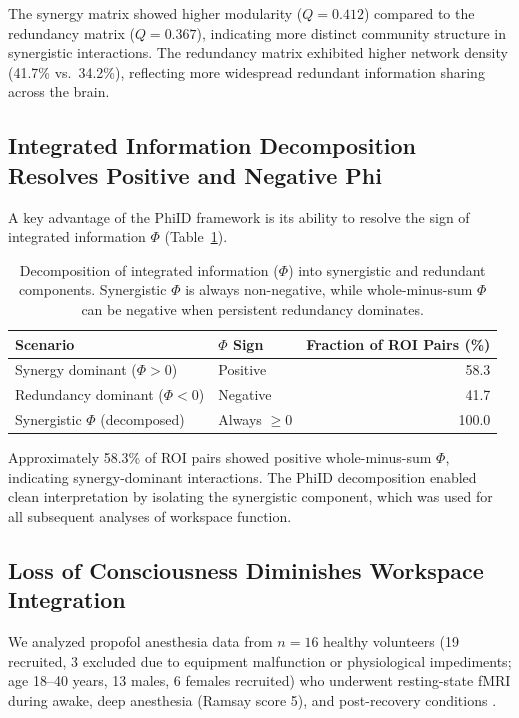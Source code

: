 \documentclass[11pt]{article}
\begin{document}
The synergy matrix showed higher modularity ($Q = 0.412$) compared to the redundancy matrix ($Q = 0.367$), indicating more distinct community structure in synergistic interactions. The redundancy matrix exhibited higher network density (41.7\% vs.\ 34.2\%), reflecting more widespread redundant information sharing across the brain.

\subsection{Integrated Information Decomposition Resolves Positive and Negative Phi}

A key advantage of the PhiID framework is its ability to resolve the sign of integrated information $\Phi$ (Table~\ref{tab:phi_decomp}).

\begin{table}[H]
\centering
\caption{Decomposition of integrated information ($\Phi$) into synergistic and redundant components. Synergistic $\Phi$ is always non-negative, while whole-minus-sum $\Phi$ can be negative when persistent redundancy dominates.}
\label{tab:phi_decomp}
\begin{tabular}{llr}
\toprule
\textbf{Scenario} & \textbf{$\Phi$ Sign} & \textbf{Fraction of ROI Pairs (\%)} \\
\midrule
Synergy dominant ($\Phi > 0$) & Positive & 58.3 \\
Redundancy dominant ($\Phi < 0$) & Negative & 41.7 \\
Synergistic $\Phi$ (decomposed) & Always $\geq 0$ & 100.0 \\
\bottomrule
\end{tabular}
\end{table}

Approximately 58.3\% of ROI pairs showed positive whole-minus-sum $\Phi$, indicating synergy-dominant interactions. The PhiID decomposition enabled clean interpretation by isolating the synergistic component, which was used for all subsequent analyses of workspace function.

\subsection{Loss of Consciousness Diminishes Workspace Integration}

We analyzed propofol anesthesia data from $n = 16$ healthy volunteers (19 recruited, 3 excluded due to equipment malfunction or physiological impediments; age 18--40 years, 13 males, 6 females recruited) who underwent resting-state fMRI during awake, deep anesthesia (Ramsay score 5), and post-recovery conditions \citep{ramsay1974controlled}.
\end{document}
